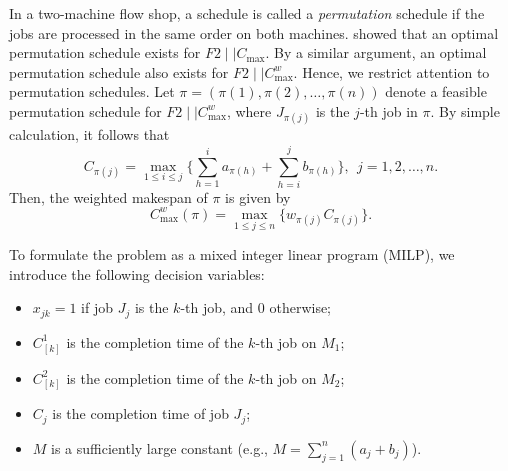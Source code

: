 ﻿\documentclass[12pt]{article} \textheight=24.5cm \textwidth=16.5cm \parskip = 0.165cm
\begin{document}
\begin{sloppypar}
        In a two-machine flow shop, a schedule is called a \textit{permutation} schedule if the jobs are processed in the same order on both machines.
        \cite{Johnson1954NRL} showed that an optimal permutation schedule exists for $F2 \mid \mid C_{\max}$.
        By a similar argument, an optimal permutation schedule also exists for $F2 \mid \mid C_{\max}^w$.
        Hence, we restrict  attention to permutation schedules.
        Let $\pi = (\pi(1), \pi(2), \ldots, \pi(n))$ denote a feasible permutation schedule for $F2 \mid \mid C_{\max}^w$, where $J_{\pi(j)}$ is the $j$-th job in $\pi$.
        By simple calculation, it follows that
        \begin{equation}\label{eq:completion}
            C_{\pi(j)} = \max_{1 \leq i \leq j} \Big\{\sum_{h=1}^{i}a_{\pi(h)} + \sum_{h=i}^{j}b_{\pi(h)} \Big\}, ~~ j=1, 2, \ldots, n.
        \end{equation}
        Then, the weighted makespan of $\pi$ is given by
        \begin{equation}\label{eq:wcmax}
            C_{\max}^w(\pi)=\max_{1 \leq j \leq n}\{ w_{\pi(j)} C_{\pi(j)}\}.
        \end{equation}

        To formulate the problem as a mixed integer linear program (MILP), we introduce the following decision variables:
        \begin{itemize}
            \item $x_{jk} = 1$ if job $J_j$ is the $k$-th job, and $0$ otherwise;

            \item $C_{[k]}^1$ is the completion time of the $k$-th job on $M_1$;

            \item $C_{[k]}^2$ is the completion time of the $k$-th job on $M_2$;

            \item $C_j$ is the completion time of job $J_j$;

            \item $M$ is a sufficiently large constant (e.g., $M=\sum_{j=1}^{n}(a_j + b_j)$).
        \end{itemize}


\end{sloppypar}
\end{document}
